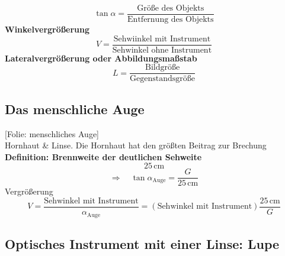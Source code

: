 \documentclass[titlepage,11pt,a4paper,ngerman]{report}
\newcommand{\tx}[1]{\textrm{#1}}
\newcommand{\folie}[1]{\color{gray}[Folie: #1]\color{black}}
\begin{document}
\begin{equation*}
\tan\alpha = \frac{\tx{Größe des Objekts}}{\tx{Entfernung des Objekts}}
\end{equation*}
\textbf{Winkelvergrößerung}
\begin{equation*}
V = \frac{\tx{Sehwiinkel mit Instrument}}{\tx{Sehwinkel ohne Instrument}}
\end{equation*}
\textbf{Lateralvergrößerung oder Abbildungsmaßstab}
\begin{equation*}
L = \frac{\tx{Bildgröße}}{\tx{Gegenstandsgröße}}
\end{equation*}

\subsection{Das menschliche Auge}

\folie{menschliches Auge}\\
Hornhaut \& Linse. Die Hornhaut hat den größten Beitrag zur Brechung\\[5pt]
\textbf{Definition: Brennweite der deutlichen Sehweite}
\begin{equation*}
25 \, \tx{cm}
\end{equation*}
\begin{equation*}
\Rightarrow \quad \tan \alpha_{\tx{Auge}} = \frac{G}{25 \, \tx{cm}}
\end{equation*}
Vergrößerung
\begin{equation*}
V = \frac{\tx{Sehwinkel mit Instrument}}{\alpha_{\tx{Auge}}} = (\tx{Sehwinkel mit Instrument}) \frac{25 \, \tx{cm}}{G}
\end{equation*}

\subsection{Optisches Instrument mit einer Linse: Lupe}
\end{document}
